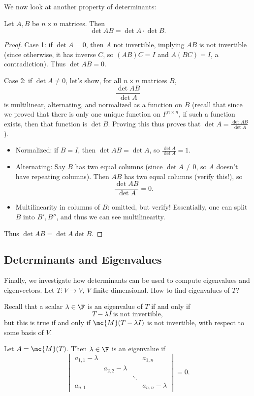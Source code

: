 \documentclass[math0540-lecture-notes.tex]{subfiles}
\begin{document}
We now look at another property of determinants: 
\begin{proposition}[]{}
  Let $A,B$ be $n\times n$ matrices. Then \[
    \det{AB}=\det{A}\cdot \det{B}
  .\] 
\end{proposition}
\begin{proof}[Proof]
  Case 1: if $\det{A}=0$, then $A$ not invertible, implying $AB$ is not invertible (since otherwise,
  it has inverse $C$, so $(AB)C=I$ and $A(BC)=I$, a contradiction). Thus $\det{AB}=0$.
  
  Case 2: if $\det{A}\neq 0$, let's show, for all $n\times n$ matrices $B$, \[
    \frac{\det{AB}}{\det{A}}
  \] is multilinear, alternating, and normalized as a function on $B$ (recall that since we proved
  that there is only one unique function on $F^{n\times n}$, if such a function exists, then that
  function is $\det{B}$. Proving this thus proves that $\det{A}=\frac{\det{AB}}{\det{A}}$).
  \begin{itemize}
    \item Normalized: if $B=I$, then $\det{AB}=\det{A}$, so $\frac{\det{A}}{\det{A}}=1$.
    \item Alternating: Say $B$ has two equal columns (since $\det{A}\neq 0$, so $A$ doesn't have
      repeating columns). Then $AB$ has two equal columns (verify this!), so \[
        \frac{\det{AB}}{\det{A}}=0
      .\] 
    \item Multilinearity in columns of $B$: omitted, but verify! Essentially, one can split $B$ into
      $B', B''$, and thus we can see multilinearity.
  \end{itemize}
  Thus $\det{AB}=\det{A}\det{B}$.
\end{proof}


\subsection{Determinants and Eigenvalues}

Finally, we investigate how determinants can be used to compute eigenvalues and eigenvectors. Let
$T:V\to V$, $V$ finite-dimensional. How to find eigenvalues of $T$?

Recall that a scalar $\lambda\in \F$ is an eigenvalue of $T$ if and only if \[
  T-\lambda I ~\text{is not invertible}
,\] but this is true if and only if $\mc{M}(T-\lambda I)$ is not invertible, with respect to some
basis of $V$.

Let $A=\mc{M}(T)$. Then $\lambda\in \F$ is an eigenvalue if \[
  \begin{vmatrix} a_{1,1}-\lambda & & & a_{1,n}\\ & a_{2,2}-\lambda & & \\ & &
  \ddots & \\ a_{n,1} & & & a_{n,n}-\lambda\end{vmatrix} =0
.\] 
\end{document}
